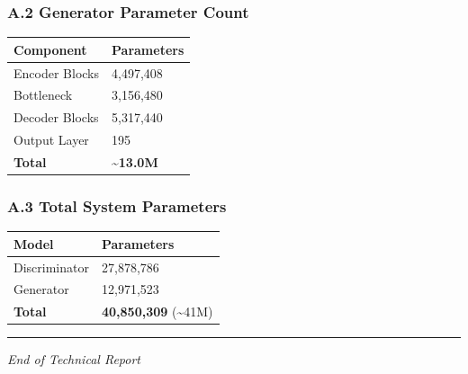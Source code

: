 \subsubsection{A.2 Generator Parameter
Count}\label{a.2-generator-parameter-count}

\begin{longtable}[]{@{}ll@{}}
\toprule\noalign{}
Component & Parameters \\
\midrule\noalign{}
\endhead
\bottomrule\noalign{}
\endlastfoot
Encoder Blocks & 4,497,408 \\
Bottleneck & 3,156,480 \\
Decoder Blocks & 5,317,440 \\
Output Layer & 195 \\
\textbf{Total} & \textbf{\textasciitilde13.0M} \\
\end{longtable}

\subsubsection{A.3 Total System
Parameters}\label{a.3-total-system-parameters}

\begin{longtable}[]{@{}ll@{}}
\toprule\noalign{}
Model & Parameters \\
\midrule\noalign{}
\endhead
\bottomrule\noalign{}
\endlastfoot
Discriminator & 27,878,786 \\
Generator & 12,971,523 \\
\textbf{Total} & \textbf{40,850,309} (\textasciitilde41M) \\
\end{longtable}

\begin{center}\rule{0.5\linewidth}{0.5pt}\end{center}

\emph{End of Technical Report}
